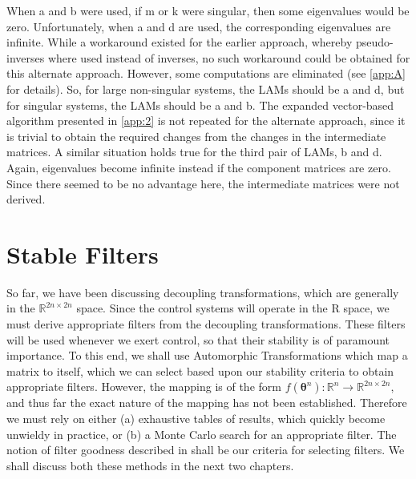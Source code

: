 When \gls{a} and \gls{b} were used, if \gls{m} or \gls{k} were singular,
then some eigenvalues would be zero. Unfortunately, when \gls{a} and 
\gls{d} are used, the corresponding eigenvalues are infinite. While a 
workaround existed for the earlier approach, whereby pseudo-inverses where 
used instead of inverses, no such workaround could be obtained for this 
alternate approach. However, some computations are eliminated (see 
\autoref{app:A} for details). So, for large non-singular systems, the LAMs 
should be \gls{a} and \gls{d}, but for singular systems, the LAMs should 
be \gls{a} and \gls{b}. The expanded vector-based algorithm presented in 
\autoref{app:2} is not repeated for the alternate approach, since it is 
trivial to obtain the required changes from the changes in the 
intermediate matrices.
A similar situation holds true for the third pair of LAMs, \gls{b} and 
\gls{d}. Again, eigenvalues become infinite instead if the component 
matrices are zero. Since there seemed to be no advantage here, the 
intermediate matrices were not derived.

\section{Stable Filters}
So far, we have been discussing decoupling transformations, which are generally in 
the $\mathbb{R}^{2n\times 2n}$ space. Since the control systems will operate in the
\gls{R} space, we must derive appropriate filters from the decoupling transformations.
These filters will be used whenever we exert control, so that their stability is of
paramount importance. To this end, we shall use Automorphic Transformations which
map a matrix to itself, which we can select based upon our stability criteria to 
obtain appropriate filters. However, the mapping is of the form 
$f(\mathbf{\theta}^{n}):\mathbb{R}^n\rightarrow\mathbb{R}^{2n\times 2n}$, and thus far
the exact nature of the mapping has not been established. Therefore we must rely 
on either (a) exhaustive tables of results, which quickly become unwieldy in 
practice, or (b) a Monte Carlo search for an appropriate filter. 
The notion of filter goodness described in \citet{Jiffri2011} shall be our criteria 
for selecting filters. We shall discuss both these methods in the next two chapters.